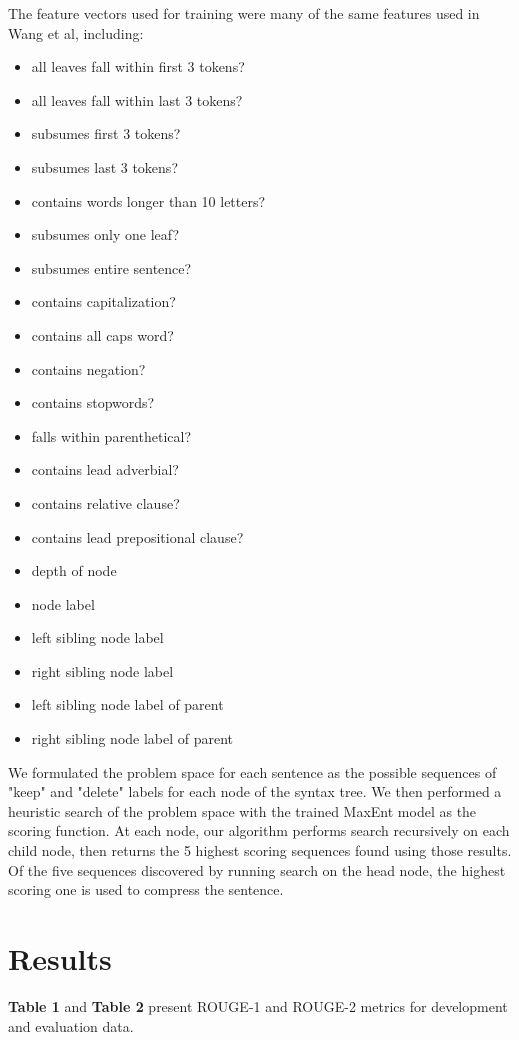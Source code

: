 \documentclass[11pt]{article}
\begin{document}
The feature vectors used for training were many of the same features used in Wang et al, including:
\begin{itemize}
\item all leaves fall within first 3 tokens?
\item all leaves fall within last 3 tokens?
\item subsumes first 3 tokens?
\item subsumes last 3 tokens?
\item contains words longer than 10 letters?
\item subsumes only one leaf?
\item subsumes entire sentence?
\item contains capitalization?
\item contains all caps word?
\item contains negation?
\item contains stopwords?
\item falls within parenthetical?
\item contains lead adverbial?
\item contains relative clause?
\item contains lead prepositional clause?
\item depth of node
\item node label
\item left sibling node label
\item right sibling node label
\item left sibling node label of parent
\item right sibling node label of parent
\end{itemize}

We formulated the problem space for each sentence as the possible sequences of "keep" and "delete" labels for each node of the syntax tree. We then performed a heuristic search of the problem space with the trained MaxEnt model as the scoring function. At each node, our algorithm performs search recursively on each child node, then returns the 5 highest scoring sequences found using those results. Of the five sequences discovered by running search on the head node, the highest scoring one is used to compress the sentence.

\section{Results}
\textbf{Table 1} and \textbf{Table 2} present ROUGE-1 and ROUGE-2 metrics for development and evaluation data.
\end{document}
